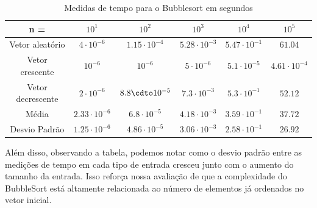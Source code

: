 \documentclass{article}
\begin{document}
\begin{table}[h]
    \begin{tabular}{c|c|c|c|c|c}
        n = & $10^{1}$ & $10^{2}$ & $10^{3}$ & $10^{4}$ & $10^{5}$ \\ 
        \hline
        Vetor aleatório & $4\cdot 10^{-6}$ & $1.15\cdot 10^{-4}$ & $5.28\cdot 10^{-3}$ & $5.47\cdot 10^{-1}$ & $61.04$ \\
        \hline
        Vetor crescente & $10^{-6}$ & $10^{-6}$ & $5\cdot 10^{-6}$ & $5.1\cdot 10^{-5}$ & $4.61\cdot 10^{-4}$\\
        \hline
        Vetor decrescente & $2\cdot10^{-6}$ & $8.8\cdto10^{-5}$ & $7.3\cdot 10^{-3}$ & $5.3\cdot 10^{-1}$ & $52.12$\\
        \hline
        Média & $2.33\cdot 10^{-6}$ & $6.8\cdot 10^{-5}$ & $4.18\cdot 10^{-3}$ & $3.59\cdot 10^{-1}$ & $37.72$ \\
        \hline
        Desvio Padrão & $1.25\cdot 10^{-6}$ & $4.86\cdot 10^{-5}$ & $3.06\cdot 10^{-3}$ & $2.58\cdot 10^{-1}$ & $26.92$ \\
    \end{tabular}
    \caption{Medidas de tempo para o Bubblesort em segundos}
\end{table}\par
Além disso, observando a tabela, podemos notar como o desvio padrão entre as medições de tempo em cada tipo de entrada cresceu junto com o aumento do tamanho da entrada. Isso reforça nossa avaliação de que a complexidade do BubbleSort está altamente relacionada ao número de elementos já ordenados no vetor inicial.
\end{document}
